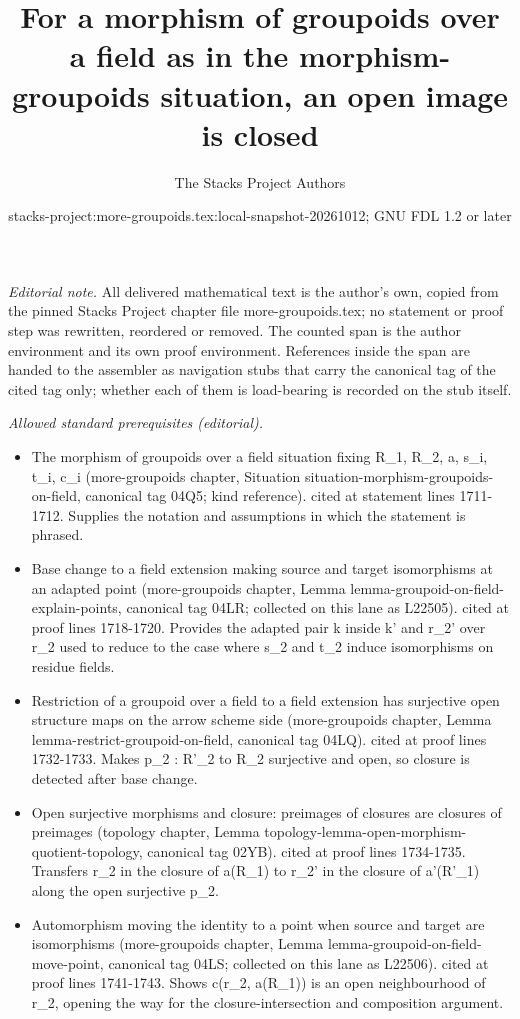 \documentclass{stacks-project}
\title{For a morphism of groupoids over a field as in the morphism-groupoids situation, an open image is closed}
\author{The Stacks Project Authors}
\date{stacks-project:more-groupoids.tex:local-snapshot-20261012; GNU FDL 1.2 or later}
\theoremstyle{plain}
\theoremstyle{definition}
\theoremstyle{remark}
\numberwithin{equation}{subsection}
\begin{document}
\maketitle
\setcounter{subsection}{1}
\noindent\textit{Editorial note.} All delivered mathematical text is the author's own, copied from the pinned Stacks Project chapter file more-groupoids.tex; no statement or proof step was rewritten, reordered or removed. The counted span is the author environment and its own proof environment. References inside the span are handed to the assembler as navigation stubs that carry the canonical tag of the cited tag only; whether each of them is load-bearing is recorded on the stub itself.\par\medskip
\noindent\textit{Allowed standard prerequisites (editorial).}\begin{itemize}
\item The morphism of groupoids over a field situation fixing R\_1, R\_2, a, s\_i, t\_i, c\_i (more-groupoids chapter, Situation situation-morphism-groupoids-on-field, canonical tag 04Q5; kind reference). cited at statement lines 1711-1712. Supplies the notation and assumptions in which the statement is phrased.
\item Base change to a field extension making source and target isomorphisms at an adapted point (more-groupoids chapter, Lemma lemma-groupoid-on-field-explain-points, canonical tag 04LR; collected on this lane as L22505). cited at proof lines 1718-1720. Provides the adapted pair k inside k' and r\_2' over r\_2 used to reduce to the case where s\_2 and t\_2 induce isomorphisms on residue fields.
\item Restriction of a groupoid over a field to a field extension has surjective open structure maps on the arrow scheme side (more-groupoids chapter, Lemma lemma-restrict-groupoid-on-field, canonical tag 04LQ). cited at proof lines 1732-1733. Makes p\_2 : R'\_2 to R\_2 surjective and open, so closure is detected after base change.
\item Open surjective morphisms and closure: preimages of closures are closures of preimages (topology chapter, Lemma topology-lemma-open-morphism-quotient-topology, canonical tag 02YB). cited at proof lines 1734-1735. Transfers r\_2 in the closure of a(R\_1) to r\_2' in the closure of a'(R'\_1) along the open surjective p\_2.
\item Automorphism moving the identity to a point when source and target are isomorphisms (more-groupoids chapter, Lemma lemma-groupoid-on-field-move-point, canonical tag 04LS; collected on this lane as L22506). cited at proof lines 1741-1743. Shows c(r\_2, a(R\_1)) is an open neighbourhood of r\_2, opening the way for the closure-intersection and composition argument.
\end{itemize}\medskip
\end{document}

